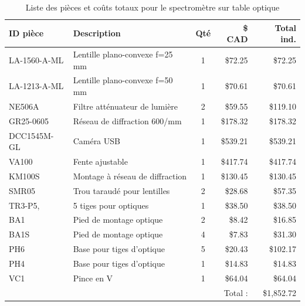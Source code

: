 \documentclass[11pt,letterpaper]{article}
\begin{document}
\begin{table}[!ht]
    \centering
    \caption{Liste des pièces et coûts totaux pour le spectromètre sur table optique}
    \begin{tabular}{|l|l|c|r|r|}
    \hline
        ID pièce & Description & Qté & \$ CAD & Total ind. \\ \hline\hline
        LA-1560-A-ML & Lentille plano-convexe f=25 mm & 1 & \$72.25 & \$72.25 \\ \hline
        LA-1213-A-ML & Lentille plano-convexe f=50 mm & 1 & \$70.61 & \$70.61 \\ \hline
        NE506A & Filtre atténuateur de lumière & 2 & \$59.55 & \$119.10 \\ \hline
        GR25-0605 & Réseau de diffraction 600/mm & 1 & \$178.32 & \$178.32 \\ \hline
        DCC1545M-GL & Caméra USB & 1 & \$539.21 & \$539.21 \\ \hline
        VA100 & Fente ajustable & 1 & \$417.74 & \$417.74 \\ \hline
        KM100S & Montage à réseau de diffraction & 1 & \$130.45 & \$130.45 \\ \hline
        SMR05 & Trou taraudé pour lentilles & 2 & \$28.68 & \$57.35 \\ \hline
        TR3-P5, & 5 tiges pour optiques & 1 & \$38.50 & \$38.50 \\ \hline
        BA1 & Pied de montage optique & 2 & \$8.42 & \$16.85 \\ \hline
        BA1S & Pied de montage optique & 4 & \$7.83 & \$31.30 \\ \hline
        PH6 & Base pour tiges d'optique & 5 & \$20.43 & \$102.17 \\ \hline
        PH4 & Base pour tiges d'optique & 1 & \$14.83 & \$14.83 \\ \hline
        VC1 & Pince en V & 1 & \$64.04 & \$64.04 \\ \hline\hline
        ~ & ~ & ~ & Total : & \$1,852.72 \\ \hline
    \end{tabular}
    \label{prix_table}
\end{table}
\end{document}
